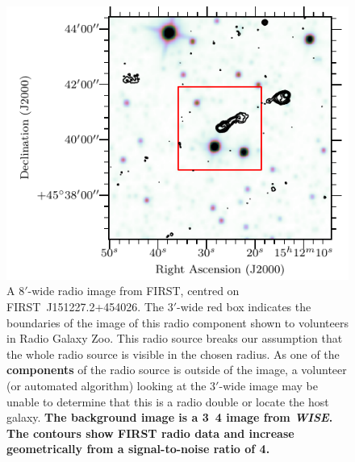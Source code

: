 \documentclass[fleqn,usenatbib,usedcolumn]{mnras}
\newcommand{\edited}[1]{{\bf {#1}}}
\begin{document}
    \begin{figure}
      \centering
      \includegraphics[width=\linewidth]{images/FIRSTJ151227_fig.pdf}
      \caption{A $8'$-wide radio image from FIRST, centred on
        FIRST\ J151227.2+454026. The $3'$-wide red box indicates the boundaries of
        the image of this radio component shown to volunteers in Radio Galaxy
        Zoo. This radio source breaks our assumption that the whole radio source
        is visible in the chosen radius. As one of the \edited{components} of the radio source
        is outside of the image, a volunteer (or automated algorithm) looking at
        the $3'$-wide image may be unable to determine that this is a radio
        double or locate the host galaxy. \edited{The background image
        is a \unit{3.4}{\micro\meter} image from \emph{WISE}. The contours show FIRST radio
        data and increase geometrically from a signal-to-noise ratio of 4.}}
      \label{fig:broken-contains}
    \end{figure}
\end{document}
